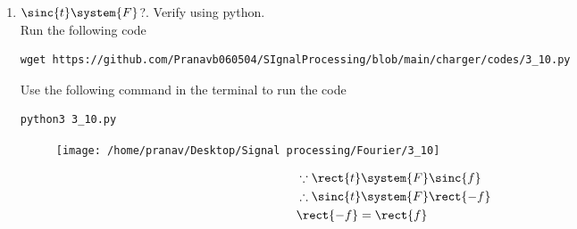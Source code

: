 \documentclass[journal,12pt,twocolumn]{IEEEtran}
\renewcommand\thesection{\arabic{section}}
\begin{document}
\begin{enumerate}[label=\thesection.\arabic*
,ref=\thesection.\theenumi]
 \begin{align}
     &\rect{t}=\begin{cases}
         1 & \frac{-1}{2}\leq t \leq \frac{1}{2}\\
         0 & \text{else}
     \end{cases}\\
     &\therefore \rect{t}\system{F} \int_{-\infty}^{\infty} \rect{t} e^{-j2\pi ft} dt\\
     &=\int_{\frac{-1}{2}}^{\frac{1}{2}} e^{-j2 \pi ft}dt=\frac{1}{2 \pi jf}\left[ e^{\pi f j}-e^{-\pi f j}\right]\\
     &=\frac{\sin{\pi f}}{\pi f}=\sinc{f}
 \end{align}
 \item 
$	 \sinc{t}\system{F} $?.  Verify using python.\\
\solution	Run the following code 
\begin{lstlisting}
wget https://github.com/Pranavb060504/SIgnalProcessing/blob/main/charger/codes/3_10.py
\end{lstlisting}
Use the following command in the terminal to run the code
\begin{lstlisting}
python3 3_10.py
\end{lstlisting}
	    \begin{figure}[!ht]
			\centering
			\texttt{[image: /home/pranav/Desktop/Signal processing/Fourier/3\_10]}
			\caption{}
			\label{fig:3_10}
\end{figure}
\begin{align}
    &\because \rect{t}\system{F}\sinc{f}\\
    &\therefore \sinc{t} \system{F} \rect{-f}\\
    &\rect{-f}=\rect{f}
    \end{align}
\end{enumerate}
\end{document}

